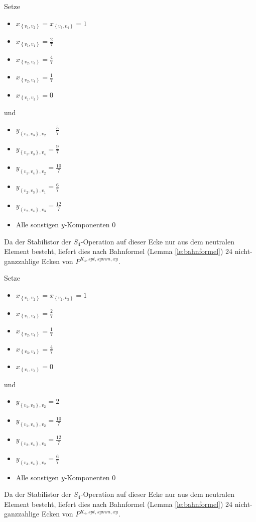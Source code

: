 \documentclass[10p,a4paper,BCOR = 12mm, DIV=15]{scrbook}
\begin{document}
\begin{Bem}
Setze
\begin{itemize}
\item $x_{\left\{v_1, v_2\right\}} = x_{\left\{v_3, v_4\right\}} = 1$
\item $x_{\left\{v_1, v_4\right\}} = \frac{2}{7}$
\item $x_{\left\{v_2, v_3\right\}} = \frac{4}{7}$
\item $x_{\left\{v_2, v_4\right\}} = \frac{1}{7}$
\item $x_{\left\{v_1, v_3\right\}} = 0$
\end{itemize}
und
\begin{itemize}
\item $y_{\left\{v_1, v_3\right\}, v_2} = \frac{5}{7}$
\item $y_{\left\{v_1, v_3\right\}, v_4} = \frac{9}{7}$
\item $y_{\left\{v_1, v_4\right\}, v_2} = \frac{10}{7}$
\item $y_{\left\{v_2, v_3\right\}, v_1} = \frac{6}{7}$
\item $y_{\left\{v_2, v_4\right\}, v_3} = \frac{12}{7}$
\item Alle sonstigen $y$-Komponenten $0$
\end{itemize}

Da der Stabilistor der $S_4$-Operation auf dieser Ecke nur aus dem neutralen Element besteht, liefert dies nach Bahnformel (Lemma \ref{le:bahnformel}) 24 nicht-ganzzahlige Ecken von $P^{K_4, spt, symm, xy}$.
\end{Bem}

\begin{Bem}
Setze
\begin{itemize}
\item $x_{\left\{v_1, v_2\right\}} = x_{\left\{v_2, v_3\right\}} = 1$
\item $x_{\left\{v_1, v_4\right\}} = \frac{2}{7}$
\item $x_{\left\{v_2, v_4\right\}} = \frac{1}{7}$
\item $x_{\left\{v_3, v_4\right\}} = \frac{4}{7}$
\item $x_{\left\{v_1, v_3\right\}} = 0$
\end{itemize}
und
\begin{itemize}
\item $y_{\left\{v_1, v_3\right\}, v_2} = 2$
\item $y_{\left\{v_1, v_4\right\}, v_2} = \frac{10}{7}$
\item $y_{\left\{v_2, v_4\right\}, v_3} = \frac{12}{7}$
\item $y_{\left\{v_3, v_4\right\}, v_2} = \frac{6}{7}$
\item Alle sonstigen $y$-Komponenten $0$
\end{itemize}

Da der Stabilistor der $S_4$-Operation auf dieser Ecke nur aus dem neutralen Element besteht, liefert dies nach Bahnformel (Lemma \ref{le:bahnformel}) 24 nicht-ganzzahlige Ecken von $P^{K_4, spt, symm, xy}$.
\end{Bem}
\end{document}
